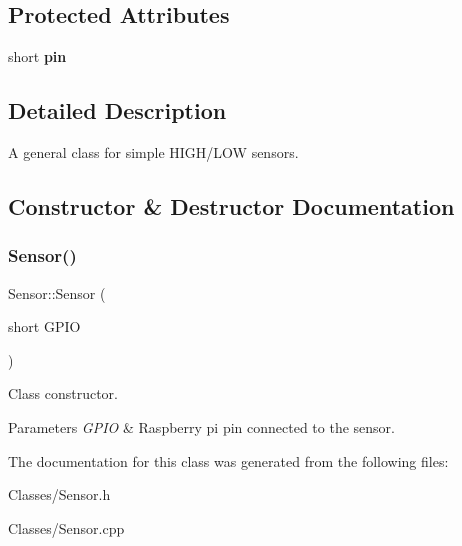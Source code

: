 \subsection*{Protected Attributes}
\begin{DoxyCompactItemize}
\item 
\mbox{\label{classSensor_ac4d08930838efb7f84ed470fa0e8979b}} 
short {\bfseries pin}
\end{DoxyCompactItemize}


\subsection{Detailed Description}
A general class for simple H\+I\+G\+H/\+L\+OW sensors. 

\subsection{Constructor \& Destructor Documentation}
\mbox{\label{classSensor_a3909b52adbe404d4ab637163001e8c86}} 
\subsubsection{\texorpdfstring{Sensor()}{Sensor()}}
{\footnotesize\ttfamily Sensor\+::\+Sensor (\begin{DoxyParamCaption}\item[{short}]{G\+P\+IO }\end{DoxyParamCaption})}



Class constructor. 


\begin{DoxyParams}{Parameters}
{\em G\+P\+IO} & Raspberry pi pin connected to the sensor. \\
\hline
\end{DoxyParams}


The documentation for this class was generated from the following files\+:\begin{DoxyCompactItemize}
\item 
Classes/Sensor.\+h\item 
Classes/Sensor.\+cpp\end{DoxyCompactItemize}
